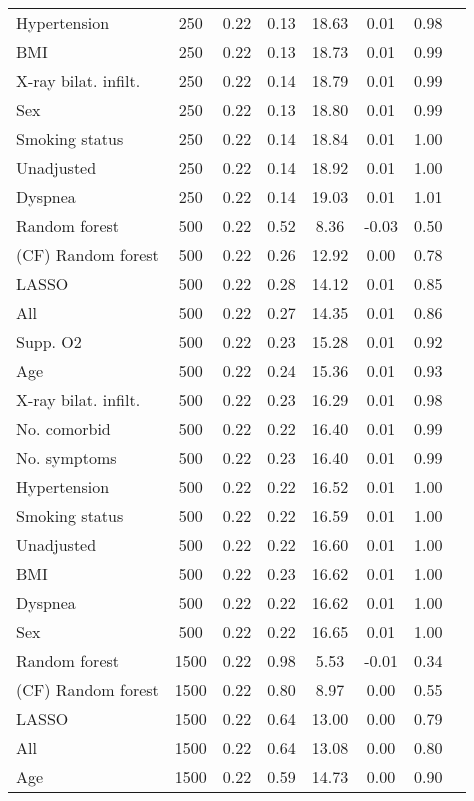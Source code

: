 \documentclass{article}
\begin{document}
{\begin{longtable}{lccccccc}
Hypertension & 250 & 0.22 & 0.13 &  18.63 &  0.01 & 0.98 \\ 
BMI & 250 & 0.22 & 0.13 &  18.73 &  0.01 & 0.99 \\ 
X-ray bilat. infilt. & 250 & 0.22 & 0.14 &  18.79 &  0.01 & 0.99 \\ 
Sex & 250 & 0.22 & 0.13 &  18.80 &  0.01 & 0.99 \\ 
Smoking status & 250 & 0.22 & 0.14 &  18.84 &  0.01 & 1.00 \\ 
Unadjusted & 250 & 0.22 & 0.14 &  18.92 &  0.01 & 1.00 \\ 
Dyspnea & 250 & 0.22 & 0.14 &  19.03 &  0.01 & 1.01 \\ \midrule() 
Random forest & 500 & 0.22 & 0.52 &   8.36 & -0.03 & 0.50 \\ 
(CF) Random forest & 500 & 0.22 & 0.26 &  12.92 &  0.00 & 0.78 \\ 
LASSO & 500 & 0.22 & 0.28 &  14.12 &  0.01 & 0.85 \\ 
All & 500 & 0.22 & 0.27 &  14.35 &  0.01 & 0.86 \\ 
Supp. O2 & 500 & 0.22 & 0.23 &  15.28 &  0.01 & 0.92 \\ 
Age & 500 & 0.22 & 0.24 &  15.36 &  0.01 & 0.93 \\ 
X-ray bilat. infilt. & 500 & 0.22 & 0.23 &  16.29 &  0.01 & 0.98 \\ 
No. comorbid & 500 & 0.22 & 0.22 &  16.40 &  0.01 & 0.99 \\ 
No. symptoms & 500 & 0.22 & 0.23 &  16.40 &  0.01 & 0.99 \\ 
Hypertension & 500 & 0.22 & 0.22 &  16.52 &  0.01 & 1.00 \\ 
Smoking status & 500 & 0.22 & 0.22 &  16.59 &  0.01 & 1.00 \\ 
Unadjusted & 500 & 0.22 & 0.22 &  16.60 &  0.01 & 1.00 \\ 
BMI & 500 & 0.22 & 0.23 &  16.62 &  0.01 & 1.00 \\ 
Dyspnea & 500 & 0.22 & 0.22 &  16.62 &  0.01 & 1.00 \\ 
Sex & 500 & 0.22 & 0.22 &  16.65 &  0.01 & 1.00 \\ \midrule() 
Random forest & 1500 & 0.22 & 0.98 &   5.53 & -0.01 & 0.34 \\ 
(CF) Random forest & 1500 & 0.22 & 0.80 &   8.97 &  0.00 & 0.55 \\ 
LASSO & 1500 & 0.22 & 0.64 &  13.00 &  0.00 & 0.79 \\ 
All & 1500 & 0.22 & 0.64 &  13.08 &  0.00 & 0.80 \\ 
Age & 1500 & 0.22 & 0.59 &  14.73 &  0.00 & 0.90 \\ 

\end{longtable}}
\end{document}
